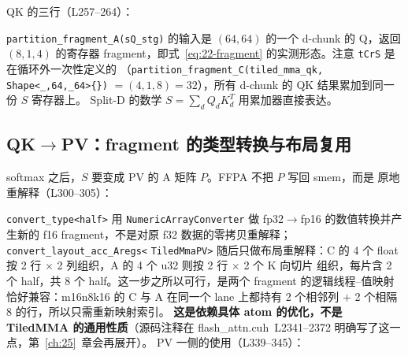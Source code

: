 QK 的三行（L257--264）：



\begin{sloppypar}
\texttt{partition\_\allowbreak{}fragment\_\allowbreak{}A\allowbreak{}(sQ\_\allowbreak{}stg)} 的输入是 $(64,64)$ 的一个
d-chunk 的 Q，返回 $(8,1,4)$ 的寄存器 fragment，即式~\eqref{eq:22-fragment}
的实测形态。注意 \texttt{tCrS} 是在循环外一次性定义的
（\texttt{partition\_\allowbreak{}fragment\_\allowbreak{}C\allowbreak{}(tiled\_\allowbreak{}mma\_\allowbreak{}qk,\allowbreak{}}\allowbreak
\texttt{Shape\allowbreak{}<\_\allowbreak{},\allowbreak{}64,\allowbreak{}\_\allowbreak{}64>\{\})}
$=(4,1,8)=32$），所有 d-chunk 的 QK 结果累加到同一份 $S$ 寄存器上。
Split-D 的数学 $S=\sum_{d} Q_d K_d^T$ 用累加器直接表达。
\end{sloppypar}

\subsection{QK$\to$PV：fragment 的类型转换与布局复用}

softmax 之后，$S$ 要变成 PV 的 A 矩阵 $P$。FFPA 不把 $P$ 写回 smem，而是
原地重解释（L300--305）：



\begin{sloppypar}
\texttt{convert\_\allowbreak{}type\allowbreak{}<half>} 用
\texttt{NumericArrayConverter} 做 fp32$\to$fp16 的数值转换并产生新的
f16 fragment，不是对原 f32 数据的零拷贝重解释；
\texttt{convert\_\allowbreak{}layout\_\allowbreak{}acc\_\allowbreak{}Aregs\allowbreak{}<}\allowbreak
\texttt{TiledMmaPV>} 随后只做布局重解释：C 的 4 个 float 按
2 行 $\times$ 2 列组织，A 的 4 个 u32 则按 2 行 $\times$ 2 个 K 向切片
组织，每片含 2 个 half，共 8 个 half。这一步之所以可行，是两个
fragment 的逻辑线程--值映射恰好兼容：m16n8k16 的 C 与 A 在同一个 lane
上都持有 2 个相邻列 $+$ 2 个相隔 8 的行，所以只需重新映射索引。
\textbf{这是依赖具体 atom 的优化，不是 TiledMMA 的通用性质}（源码注释在
flash\_attn.cuh~L2341--2372 明确写了这一点，第~\ref{ch:25}~章会再展开）。
PV 一侧的使用（L339--345）：
\end{sloppypar}



